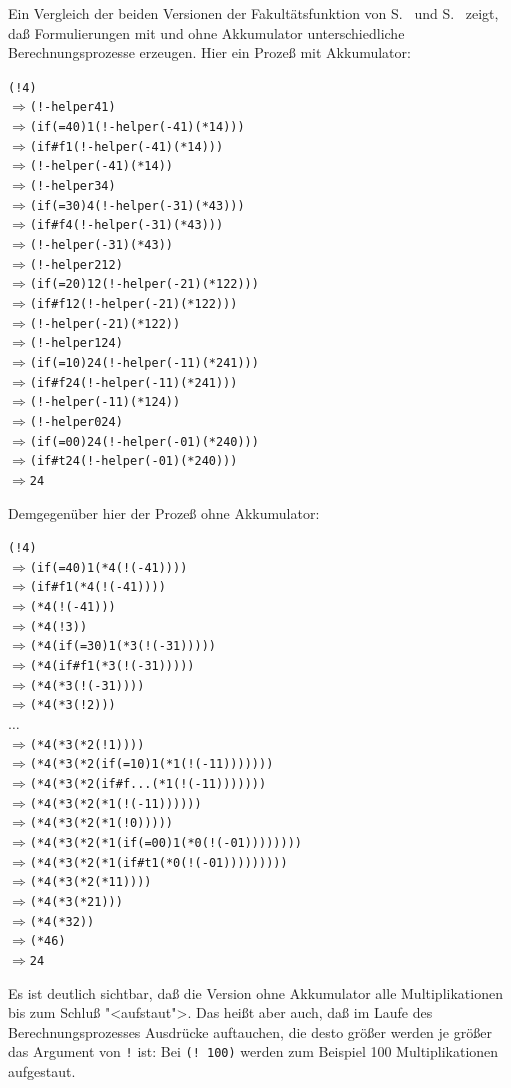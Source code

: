 Ein Vergleich der beiden Versionen der Fakultätsfunktion von
S.~\pageref{page:factorial} und S.~\pageref{page:factorial-tail} zeigt, daß
Formulierungen mit und ohne Akkumulator
unterschiedliche Berechnungsprozesse erzeugen.  Hier ein Prozeß mit
Akkumulator:
%
\begin{alltt}
(! 4)
\(\Longrightarrow\) (!-helper 4 1)
\(\Longrightarrow\) (if (= 4 0) 1 (!-helper (- 4 1) (* 1 4)))
\(\Longrightarrow\) (if #f 1 (!-helper (- 4 1) (* 1 4)))
\(\Longrightarrow\) (!-helper (- 4 1) (* 1 4))
\(\Longrightarrow\) (!-helper 3 4)
\(\Longrightarrow\) (if (= 3 0) 4 (!-helper (- 3 1) (* 4 3)))
\(\Longrightarrow\) (if #f 4 (!-helper (- 3 1) (* 4 3)))
\(\Longrightarrow\) (!-helper (- 3 1) (* 4 3))
\(\Longrightarrow\) (!-helper 2 12)
\(\Longrightarrow\) (if (= 2 0) 12 (!-helper (- 2 1) (* 12 2)))
\(\Longrightarrow\) (if #f 12 (!-helper (- 2 1) (* 12 2)))
\(\Longrightarrow\) (!-helper (- 2 1) (* 12 2))
\(\Longrightarrow\) (!-helper 1 24)
\(\Longrightarrow\) (if (= 1 0) 24 (!-helper (- 1 1) (* 24 1)))
\(\Longrightarrow\) (if #f 24 (!-helper (- 1 1) (* 24 1)))
\(\Longrightarrow\) (!-helper (- 1 1) (* 1 24))
\(\Longrightarrow\) (!-helper 0 24)
\(\Longrightarrow\) (if (= 0 0) 24 (!-helper (- 0 1) (* 24 0)))
\(\Longrightarrow\) (if #t 24 (!-helper (- 0 1) (* 24 0)))
\(\Longrightarrow\) 24
\end{alltt}
%
Demgegenüber hier der Prozeß ohne Akkumulator:
%
\begin{alltt}
(! 4)
\(\Longrightarrow\) (if (= 4 0) 1 (* 4 (! (- 4 1))))
\(\Longrightarrow\) (if #f 1 (* 4 (! (- 4 1))))
\(\Longrightarrow\) (* 4 (! (- 4 1)))
\(\Longrightarrow\) (* 4 (! 3))
\(\Longrightarrow\) (* 4 (if (= 3 0) 1 (* 3 (! (- 3 1)))))
\(\Longrightarrow\) (* 4 (if #f 1 (* 3 (! (- 3 1)))))
\(\Longrightarrow\) (* 4 (* 3 (! (- 3 1))))
\(\Longrightarrow\) (* 4 (* 3 (! 2)))
\(\ldots\)
\(\Longrightarrow\) (* 4 (* 3 (* 2 (! 1))))
\(\Longrightarrow\) (* 4 (* 3 (* 2 (if (= 1 0) 1 (* 1 (! (- 1 1)))))))
\(\Longrightarrow\) (* 4 (* 3 (* 2 (if #f ... (* 1 (! (- 1 1)))))))
\(\Longrightarrow\) (* 4 (* 3 (* 2 (* 1 (! (- 1 1))))))
\(\Longrightarrow\) (* 4 (* 3 (* 2 (* 1 (! 0)))))
\(\Longrightarrow\) (* 4 (* 3 (* 2 (* 1 (if (= 0 0) 1 (* 0 (! (- 0 1))))))))
\(\Longrightarrow\) (* 4 (* 3 (* 2 (* 1 (if #t 1 (* 0 (! (- 0 1)))))))))
\(\Longrightarrow\) (* 4 (* 3 (* 2 (* 1 1))))
\(\Longrightarrow\) (* 4 (* 3 (* 2 1)))
\(\Longrightarrow\) (* 4 (* 3 2))
\(\Longrightarrow\) (* 4 6)
\(\Longrightarrow\) 24
\end{alltt}
%
Es ist deutlich sichtbar, daß die Version ohne Akkumulator alle
Multiplikationen bis zum Schluß "<aufstaut">.  Das heißt aber auch,
daß im Laufe des Berechnungsprozesses Ausdrücke auftauchen, die desto
größer werden je größer das Argument von \texttt{!} ist: Bei
\texttt{(!  100)} werden zum Beispiel 100 Multiplikationen aufgestaut.


